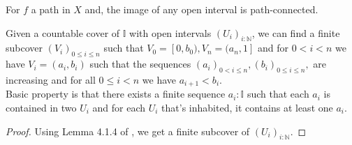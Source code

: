 \documentclass{../util/zariski}
\begin{document}
\begin{remark}\label{imageOpenPathConnected}
  For $f$ a path in $X$ and, the image of any open interval is path-connected. 
\end{remark}

\begin{lemma}\label{niceIntervalCover}
  Given a countable cover  of $\mathbb I$ with open intervals $(U_i)_{i:\mathbb N}$, 
  we can find a finite subcover $(V_i)_{0\leq i \leq n}$ 
  such that $V_0 = [0,b_0), V_n = (a_n, 1]$ and for $0<i<n$ we have $V_i = (a_i, b_i)$ 
  such that the sequences 
  $
  (a_i)_{0<i\leq n} , (b_i)_{0\leq i \leq n}, 
  $
  are increasing and for all $0\leq i < n$ we have 
  $a_{i+1}<b_i$. 
  \\


  Basic property is that there exists a finite sequence $a_i:\mathbb I$
  such that each $a_i$ is contained in two $U_i$ and for each 
  $U_i$ that's inhabited, it contains at least one $a_i$. 
\end{lemma}
\begin{proof}
  Using Lemma 4.1.4 of \cite{synthetic-stone-duality}, 
  we get a finite subcover of $(U_i)_{i:\mathbb N}$. 
\end{proof}
\end{document}
